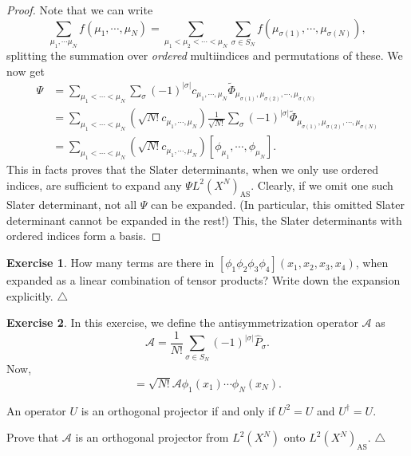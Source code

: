 \documentclass{report}
\theoremstyle{plain}
\theoremstyle{definition}
\newtheorem{exerc}{Exercise}[chapter]
\newcommand\xqed[1]{%
  \leavevmode\unskip\penalty9999 \hbox{}\nobreak\hfill
  \quad\hbox{#1}}
\newcommand\demo{\xqed{$\triangle$}}
\newenvironment{exercise}{\bigskip\begin{exerc}}{\demo\end{exerc}\bigskip}
\begin{document}
\begin{proof}
Note that we can write
\begin{equation}
  \sum_{\mu_1,\cdots\mu_N} f(\mu_1,\cdots,\mu_N) = \sum_{\mu_1<\mu_2<\cdots<\mu_N}
  \sum_{\sigma\in S_N} f(\mu_{\sigma(1)},\cdots,\mu_{\sigma(N)}),
\end{equation}
splitting the summation over \emph{ordered} multiindices and
permutations of these. We now get
\begin{equation}
  \begin{split}
    \Psi &= \sum_{\mu_1<\cdots<\mu_N} \sum_\sigma (-1)^{|\sigma|}
    c_{\mu_1,\cdots,\mu_N}
    \tilde{\Phi}_{\mu_{\sigma(1)},\mu_{\sigma(2)},\cdots,\mu_{\sigma(N)}} \\
    &=\sum_{\mu_1<\cdots<\mu_N} (\sqrt{N!} c_{\mu_1,\cdots,\mu_N})
    \frac{1}{\sqrt{N!}} \sum_\sigma (-1)^{|\sigma|}
    \tilde{\Phi}_{\mu_{\sigma(1)},\mu_{\sigma(2)},\cdots,\mu_{\sigma(N)}} \\
    &= \sum_{\mu_1<\cdots<\mu_N} (\sqrt{N!} c_{\mu_1,\cdots,\mu_N})
    [\phi_{\mu_1},\cdots,\phi_{\mu_N}].
  \end{split}
\end{equation}
This in facts proves that the Slater determinants, when we only use
ordered indices, are sufficient to expand any $\Psi
L^2(X^N)_\text{AS}$. Clearly, if we omit one such Slater determinant,
not all $\Psi$ can be expanded. (In particular, this omitted Slater
determinant cannot be expanded in the rest!) This, the Slater
determinants with ordered indices form a basis.
\end{proof}

\begin{exercise}
  How many terms are there in
  $[\phi_1\phi_2\phi_3\phi_4](x_1,x_2,x_3,x_4)$, when expanded as a
  linear combination of tensor products? Write down the expansion
  explicitly.
\end{exercise}



\begin{exercise}

  In this exercise, we define the antisymmetrization operator $\mathscr{A}$ as
  \begin{equation}
    \mathscr{A} = \frac{1}{N!} \sum_{\sigma \in S_N} (-1)^{|\sigma|}
    \hat{P}_\sigma.\label{eq:antisym}
  \end{equation}
  Now,
  \begin{equation}
    [\phi_1,\cdots,\phi_N] = \sqrt{N!} \mathscr{A} \phi_1(x_1)\cdots\phi_N(x_N).
  \end{equation}

  An operator $U$ is an orthogonal projector if and only if $U^2=U$
  and $U^\dag = U$.

  Prove that $\mathscr{A}$ is an orthogonal projector from $L^2(X^N)$
  onto $L^2(X^N)_\text{AS}$.
\end{exercise}
\end{document}
